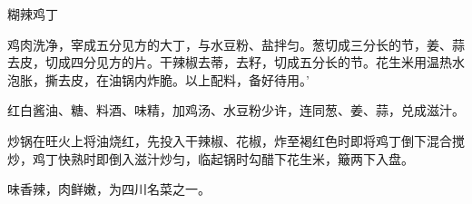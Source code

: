 \begin{recipe}[宫保鸡丁]{糊辣鸡丁}

\ingredients


\cooking

\step 鸡肉洗净，宰成五分见方的大丁，与水豆粉、盐拌匀。葱切成三分长的节，姜、蒜去皮，切成四分见方的片。干辣椒去蒂，去籽，切成五分长的节。花生米用温热水泡胀，撕去皮，在油锅内炸脆。以上配料，备好待用。’

\step 红白酱油、糖、料酒、味精，加鸡汤、水豆粉少许，连同葱、姜、蒜，兑成滋汁。

\step 炒锅在旺火上将油烧红，先投入干辣椒、花椒，炸至褐红色时即将鸡丁倒下混合搅炒，鸡丁快熟时即倒入滋汁炒匀，临起锅时勾醋下花生米，簸两下入盘。

\notes

味香辣，肉鲜嫩，为四川名菜之一。

\end{recipe}

